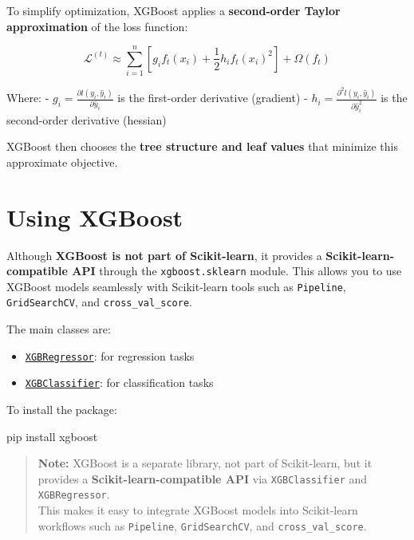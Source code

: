 \documentclass[
  letterpaper,
  DIV=11,
  numbers=noendperiod]{scrreprt}
\newenvironment{Shaded}{\begin{snugshade}}{\end{snugshade}}
\newcommand{\ExtensionTok}[1]{\textcolor[rgb]{0.00,0.23,0.31}{#1}}
\newcommand{\NormalTok}[1]{\textcolor[rgb]{0.00,0.23,0.31}{#1}}
\providecommand{\tightlist}{%
  \setlength{\itemsep}{0pt}\setlength{\parskip}{0pt}}\usepackage{longtable,booktabs,array}
\begin{document}
To simplify optimization, XGBoost applies a \textbf{second-order Taylor
approximation} of the loss function:

\[
\mathcal{L}^{(t)} \approx \sum_{i=1}^n \left[ g_i f_t(x_i) + \frac{1}{2} h_i f_t(x_i)^2 \right] + \Omega(f_t)
\]

Where: - \(g_i = \frac{\partial l(y_i, \hat{y}_i)}{\partial \hat{y}_i}\)
is the first-order derivative (gradient) -
\(h_i = \frac{\partial^2 l(y_i, \hat{y}_i)}{\partial \hat{y}_i^2}\) is
the second-order derivative (hessian)

XGBoost then chooses the \textbf{tree structure and leaf values} that
minimize this approximate objective.

\section{Using XGBoost}\label{using-xgboost}

Although \textbf{XGBoost is not part of Scikit-learn}, it provides a
\textbf{Scikit-learn-compatible API} through the
\texttt{xgboost.sklearn} module. This allows you to use XGBoost models
seamlessly with Scikit-learn tools such as \texttt{Pipeline},
\texttt{GridSearchCV}, and \texttt{cross\_val\_score}.

The main classes are:

\begin{itemize}
\tightlist
\item
  \href{https://xgboost.readthedocs.io/en/stable/python/python_api/xgboost.XGBRegressor.html}{\texttt{XGBRegressor}}:
  for regression tasks\\
\item
  \href{https://xgboost.readthedocs.io/en/stable/python/python_api/xgboost.XGBClassifier.html}{\texttt{XGBClassifier}}:
  for classification tasks
\end{itemize}

To install the package:

\begin{Shaded}
\begin{Highlighting}[]
\ExtensionTok{pip}\NormalTok{ install xgboost}
\end{Highlighting}
\end{Shaded}

\begin{quote}
\textbf{Note:} XGBoost is a separate library, not part of Scikit-learn,
but it provides a \textbf{Scikit-learn-compatible API} via
\texttt{XGBClassifier} and \texttt{XGBRegressor}.\\
This makes it easy to integrate XGBoost models into Scikit-learn
workflows such as \texttt{Pipeline}, \texttt{GridSearchCV}, and
\texttt{cross\_val\_score}.
\end{quote}
\end{document}

